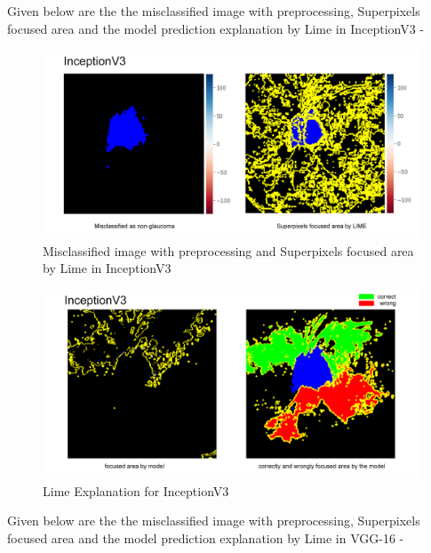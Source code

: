 \newpage
\vspace{5mm}
\noindent Given below are the the misclassified image with preprocessing, Superpixels focused area and the model prediction explanation by Lime in InceptionV3 -

\vspace{5mm}
\begin{figure}[hbt!]
\centering
\includegraphics[scale=0.45]{images/fig-44.png}
\caption{Misclassified image with preprocessing and Superpixels focused area by Lime in InceptionV3
}
\label{fig:x Misclassified image with preprocessing and Superpixels focused area by Lime in InceptionV3
}
\end{figure}

\vspace{5mm}
\begin{figure}[hbt!]
\centering
\includegraphics[scale=0.45]{images/fig-45.png}
\caption{Lime Explanation for InceptionV3}
\label{fig:x Lime Explanation for InceptionV3}
\end{figure}

\newpage
\vspace{5mm}
\noindent Given below are the the misclassified image with preprocessing, Superpixels focused area and the model prediction explanation by Lime in VGG-16 -

